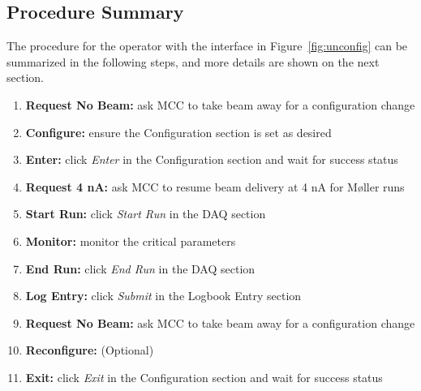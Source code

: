 \documentclass[amsmath,amssymb,notitlepage,12pt]{revtex4}
\begin{document}
\subsection{Procedure Summary}
The procedure for the operator with the interface in Figure~\ref{fig:unconfig} can be summarized in the following steps, and more details are shown on the next section.
\begin{enumerate}
\vspace{-4mm}\item {\bf Request No Beam:}  ask MCC to take beam away for a configuration change
\vspace{-4mm}\item {\bf Configure:}  ensure the Configuration section is set as desired
\vspace{-4mm}\item {\bf Enter:} click {\em Enter} in the Configuration section and wait for success status
\vspace{-4mm}\item {\bf Request 4 nA:} ask MCC to resume beam delivery at 4 nA for M{\o}ller runs
\vspace{-4mm}\item {\bf Start Run:} click {\em Start Run} in the DAQ section
\vspace{-4mm}\item {\bf Monitor:} monitor the critical parameters
\vspace{-4mm}\item {\bf End Run:} click {\em End Run} in the DAQ section
\vspace{-4mm}\item {\bf Log Entry:} click {\em Submit} in the Logbook Entry section 
\vspace{-4mm}\item {\bf Request No Beam:} ask MCC to take beam away for a configuration change
\vspace{-4mm}\item {\bf Reconfigure:} (Optional)
\vspace{-4mm}\item {\bf Exit:} click {\em Exit} in the Configuration section and wait for success status
\end{enumerate}
\end{document}
